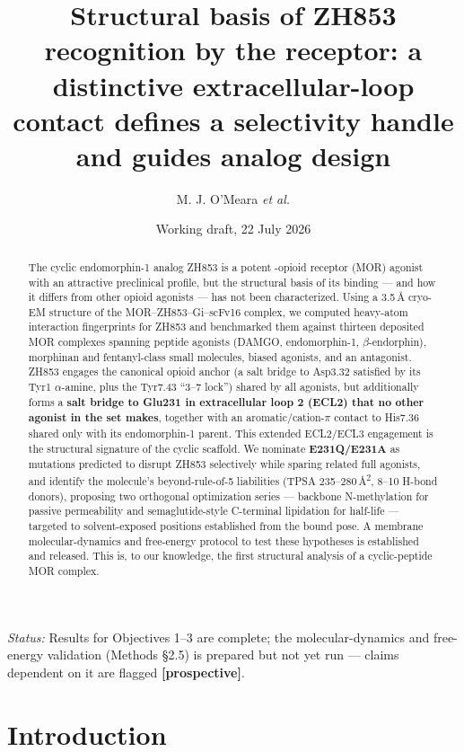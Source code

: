 \documentclass[11pt]{article}
\title{\vspace{-2em}\bfseries Structural basis of ZH853 recognition by the \uor{} receptor:
a distinctive extracellular-loop contact defines a selectivity handle and guides analog design}
\author[1]{M. J. O'Meara \emph{et al.}}
\affil[1]{Department of Computational Medicine and Bioinformatics, University of Michigan}
\date{Working draft, 22 July 2026}
\newcommand{\uOR}{\textmu-opioid receptor}
\newcommand{\Ang}{\AA}
\newcommand{\Angsq}{\AA\textsuperscript{2}}
\newcommand{\bt}{$\beta$}
\newcommand{\al}{$\alpha$}
\newcommand{\pistack}{$\pi$}
\begin{document}
\maketitle

\noindent\small\emph{Status:} Results for Objectives 1--3 are complete; the molecular-dynamics and
free-energy validation (Methods \S2.5) is prepared but not yet run --- claims dependent on it are
flagged \textbf{[prospective]}.\normalsize

\begin{abstract}
\noindent The cyclic endomorphin-1 analog ZH853 is a potent \uOR{} (MOR) agonist with an attractive
preclinical profile, but the structural basis of its binding --- and how it differs from other opioid
agonists --- has not been characterized. Using a 3.5\,\Ang{} cryo-EM structure of the
MOR--ZH853--Gi--scFv16 complex, we computed heavy-atom interaction fingerprints for ZH853 and
benchmarked them against thirteen deposited MOR complexes spanning peptide agonists (DAMGO,
endomorphin-1, \bt-endorphin), morphinan and fentanyl-class small molecules, biased agonists, and an
antagonist. ZH853 engages the canonical opioid anchor (a salt bridge to Asp3.32 satisfied by its Tyr1
\al-amine, plus the Tyr7.43 ``3--7 lock'') shared by all agonists, but additionally forms a
\textbf{salt bridge to Glu231 in extracellular loop 2 (ECL2) that no other agonist in the set makes},
together with an aromatic/cation-\pistack{} contact to His7.36 shared only with its endomorphin-1
parent. This extended ECL2/ECL3 engagement is the structural signature of the cyclic scaffold. We
nominate \textbf{E231Q/E231A} as mutations predicted to disrupt ZH853 selectively while sparing
related full agonists, and identify the molecule's beyond-rule-of-5 liabilities (TPSA 235--280\,\Angsq,
8--10 H-bond donors), proposing two orthogonal optimization series --- backbone N-methylation for
passive permeability and semaglutide-style C-terminal lipidation for half-life --- targeted to
solvent-exposed positions established from the bound pose. A membrane molecular-dynamics and
free-energy protocol to test these hypotheses is established and released. This is, to our knowledge,
the first structural analysis of a cyclic-peptide MOR complex.
\end{abstract}

\section{Introduction}
\end{document}
